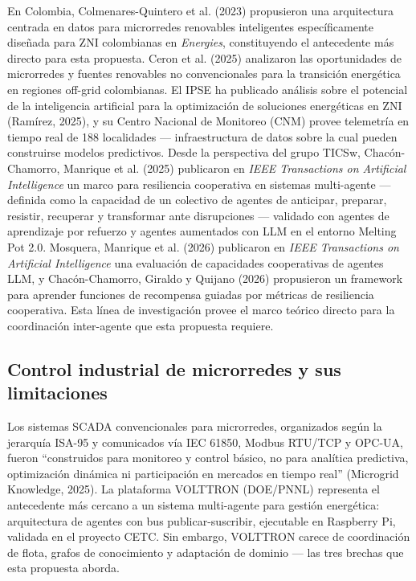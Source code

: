 \documentclass[12pt,letterpaper]{article}
\begin{document}
En Colombia, Colmenares-Quintero et al. (2023) propusieron una arquitectura centrada en datos para microrredes renovables inteligentes espec\'ificamente dise\~nada para ZNI colombianas en \textit{Energies}, constituyendo el antecedente m\'as directo para esta propuesta. Ceron et al. (2025) analizaron las oportunidades de microrredes y fuentes renovables no convencionales para la transici\'on energ\'etica en regiones off-grid colombianas. El IPSE ha publicado an\'alisis sobre el potencial de la inteligencia artificial para la optimizaci\'on de soluciones energ\'eticas en ZNI (Ram\'irez, 2025), y su Centro Nacional de Monitoreo (CNM) provee telemetr\'ia en tiempo real de 188 localidades --- infraestructura de datos sobre la cual pueden construirse modelos predictivos. Desde la perspectiva del grupo TICSw, Chac\'on-Chamorro, Manrique et al. (2025) publicaron en \textit{IEEE Transactions on Artificial Intelligence} un marco para resiliencia cooperativa en sistemas multi-agente --- definida como la capacidad de un colectivo de agentes de anticipar, preparar, resistir, recuperar y transformar ante disrupciones --- validado con agentes de aprendizaje por refuerzo y agentes aumentados con LLM en el entorno Melting Pot 2.0. Mosquera, Manrique et al. (2026) publicaron en \textit{IEEE Transactions on Artificial Intelligence} una evaluaci\'on de capacidades cooperativas de agentes LLM, y Chac\'on-Chamorro, Giraldo y Quijano (2026) propusieron un framework para aprender funciones de recompensa guiadas por m\'etricas de resiliencia cooperativa. Esta l\'inea de investigaci\'on provee el marco te\'orico directo para la coordinaci\'on inter-agente que esta propuesta requiere.

\subsection*{Control industrial de microrredes y sus limitaciones}

Los sistemas SCADA convencionales para microrredes, organizados seg\'un la jerarqu\'ia ISA-95 y comunicados v\'ia IEC 61850, Modbus RTU/TCP y OPC-UA, fueron ``construidos para monitoreo y control b\'asico, no para anal\'itica predictiva, optimizaci\'on din\'amica ni participaci\'on en mercados en tiempo real'' (Microgrid Knowledge, 2025). La plataforma VOLTTRON (DOE/PNNL) representa el antecedente m\'as cercano a un sistema multi-agente para gesti\'on energ\'etica: arquitectura de agentes con bus publicar-suscribir, ejecutable en Raspberry Pi, validada en el proyecto CETC. Sin embargo, VOLTTRON carece de coordinaci\'on de flota, grafos de conocimiento y adaptaci\'on de dominio --- las tres brechas que esta propuesta aborda.
\end{document}
